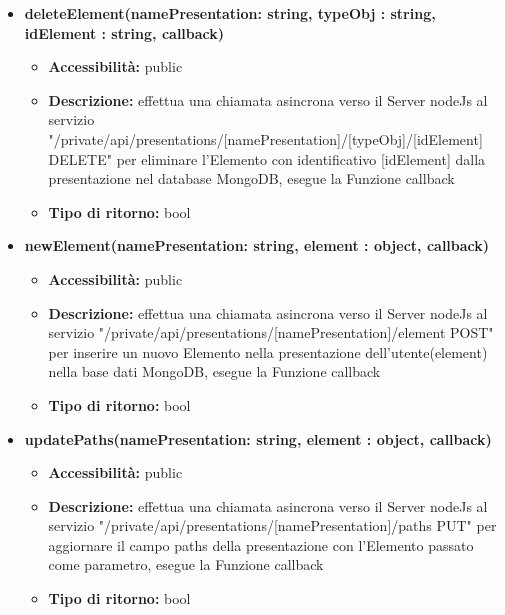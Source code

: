 {\begin{itemize}
		\item \textbf{deleteElement(namePresentation: string, typeObj : string, idElement : string, callback) }
			\begin{itemize}
			\item \textbf{Accessibilit\`{a}:} public
			\item \textbf{Descrizione:} effettua una chiamata asincrona verso il Server nodeJs al servizio "/private/api/presentations/[namePresentation]/[typeObj]/[idElement] DELETE" per eliminare l'Elemento con identificativo [idElement] dalla presentazione nel database MongoDB, esegue la Funzione callback
			\item \textbf{Tipo di ritorno:} bool
			\end{itemize}
			
		\item \textbf{newElement(namePresentation: string, element : object, callback)}
			\begin{itemize}
			\item \textbf{Accessibilit\`{a}:} public
			\item \textbf{Descrizione:} effettua una chiamata asincrona verso il Server nodeJs al servizio "/private/api/presentations/[namePresentation]/element POST" per inserire un nuovo Elemento nella presentazione dell'utente(element) nella base dati MongoDB, esegue la Funzione callback
 			\item \textbf{Tipo di ritorno:} bool
			\end{itemize}
			
		\item \textbf{updatePaths(namePresentation: string, element : object, callback) }
			\begin{itemize}
			\item \textbf{Accessibilit\`{a}:} public
			\item \textbf{Descrizione:} effettua una chiamata asincrona verso il Server nodeJs al servizio "/private/api/presentations/[namePresentation]/paths PUT" per aggiornare il campo paths della presentazione con l'Elemento passato come parametro, esegue la Funzione callback
			\item \textbf{Tipo di ritorno:} bool
			\end{itemize}

		\end{itemize}
	}
	
	
	
	
	
	
	
	
	
	
	
	
	
	
	